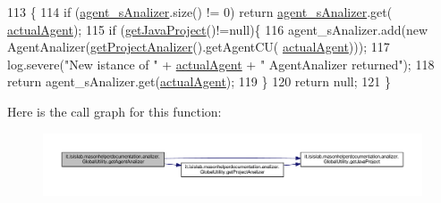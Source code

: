 \begin{DoxyCode}
113                                                    \{
114         \textcolor{keywordflow}{if} (\hyperlink{classit_1_1isislab_1_1masonhelperdocumentation_1_1analizer_1_1_global_utility_a82af8b91f98c70ad25d504cc16e424b9}{agent\_sAnalizer}.size() != 0) \textcolor{keywordflow}{return} \hyperlink{classit_1_1isislab_1_1masonhelperdocumentation_1_1analizer_1_1_global_utility_a82af8b91f98c70ad25d504cc16e424b9}{agent\_sAnalizer}.get(
      \hyperlink{classit_1_1isislab_1_1masonhelperdocumentation_1_1analizer_1_1_global_utility_a8106b6699b9c7834ead4fc38d62a2575}{actualAgent});
115         \textcolor{keywordflow}{if} (\hyperlink{classit_1_1isislab_1_1masonhelperdocumentation_1_1analizer_1_1_global_utility_a1ce214dc72551ff78133933c461d4e59}{getJavaProject}()!=null)\{
116             agent\_sAnalizer.add(\textcolor{keyword}{new} AgentAnalizer(\hyperlink{classit_1_1isislab_1_1masonhelperdocumentation_1_1analizer_1_1_global_utility_af6bcca0c06ec6fa8c2b2b88f5050914c}{getProjectAnalizer}().getAgentCU(
      \hyperlink{classit_1_1isislab_1_1masonhelperdocumentation_1_1analizer_1_1_global_utility_a8106b6699b9c7834ead4fc38d62a2575}{actualAgent})));
117             log.severe(\textcolor{stringliteral}{"New istance of "} + \hyperlink{classit_1_1isislab_1_1masonhelperdocumentation_1_1analizer_1_1_global_utility_a8106b6699b9c7834ead4fc38d62a2575}{actualAgent} + \textcolor{stringliteral}{" AgentAnalizer returned"});
118             \textcolor{keywordflow}{return} agent\_sAnalizer.get(\hyperlink{classit_1_1isislab_1_1masonhelperdocumentation_1_1analizer_1_1_global_utility_a8106b6699b9c7834ead4fc38d62a2575}{actualAgent});
119         \}
120         \textcolor{keywordflow}{return} null;
121     \}
\end{DoxyCode}


Here is the call graph for this function\-:
\nopagebreak
\begin{figure}[H]
\begin{center}
\leavevmode
\includegraphics[width=350pt]{classit_1_1isislab_1_1masonhelperdocumentation_1_1analizer_1_1_global_utility_a0853970ee6f3d2b617fc1dd5fcd172ce_cgraph}
\end{center}
\end{figure}




